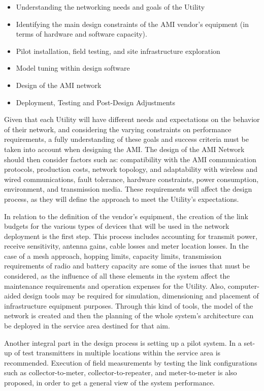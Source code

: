 \documentclass[11pt,final,onecolumn]{IEEEtran}
\begin{document}
\begin{itemize}
\item Understanding the networking needs and goals of the Utility
\item Identifying the main design constraints of the AMI vendor’s equipment (in terms of hardware and software capacity).
\item Pilot installation, field testing, and site infrastructure exploration
\item Model tuning within design software
\item Design of the AMI network 
\item Deployment, Testing and Post-Design Adjustments
\end{itemize}
		
Given that each Utility will have different needs and expectations on the behavior of their network, and considering the varying constraints on performance requirements, a fully understanding of these goals and success criteria must be taken into account when designing the AMI. The design of the AMI Network should then consider factors such as: compatibility with the AMI communication protocols, production costs, network topology, and adaptability with wireless and wired communications, fault tolerance, hardware constraints, power consumption, environment, and transmission media. These requirements will affect the design process, as they will define the approach to meet the Utility’s expectations.

In relation to the definition of the vendor’s equipment, the creation of the link budgets for the various types of devices that will be used in the network deployment is the first step. This process includes accounting for transmit power, receive sensitivity, antenna gains, cable losses and meter location losses. In the case of a mesh approach, hopping limits, capacity limits, transmission requirements of radio and battery capacity are some of the issues that must be considered, as the influence of all these elements in the system affect the maintenance requirements and operation expenses for the Utility. Also, computer-aided design tools may be required for simulation, dimensioning and placement of infrastructure equipment purposes.  Through this kind of tools, the model of the network is created and then the planning of the whole system’s architecture can be deployed in the service area destined for that aim. 

Another integral part in the design process is setting up a pilot system. In \cite{Leon2011}  a set-up of test transmitters in multiple locations within the service area is recommended. Execution of field measurements by testing the link configurations such as collector-to-meter, collector-to-repeater, and meter-to-meter is also proposed, in order to get a general view of the system performance.  
\end{document}
